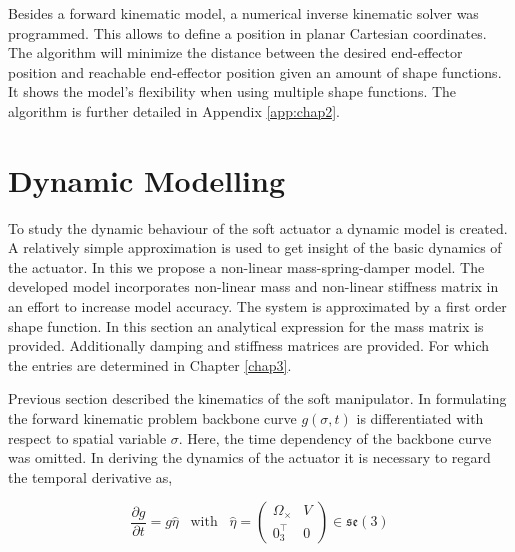 Besides a forward kinematic model, a numerical inverse kinematic solver was programmed. This allows to define a position in planar Cartesian coordinates. The algorithm will minimize the distance between the desired end-effector position and reachable end-effector position given an amount of shape functions. It shows the model's flexibility when using multiple shape functions. The algorithm is further detailed in Appendix \ref{app:chap2}. 

\newpage


\section{Dynamic Modelling}


To study the dynamic behaviour of the soft actuator a dynamic model is created. A relatively simple approximation is used to get insight of the basic dynamics of the actuator. In this we propose a non-linear mass-spring-damper model. The developed model incorporates non-linear mass and non-linear stiffness matrix in an effort to increase model accuracy. The system is approximated by a first order shape function. In this section an analytical expression for the mass matrix is provided. Additionally damping and stiffness matrices are provided. For which the entries are determined in Chapter \ref{chap3}.

Previous section described the kinematics of the soft manipulator. In formulating the forward kinematic problem backbone curve $g(\sigma,t)$ is differentiated with respect to spatial variable $\sigma$. Here, the time dependency of the backbone curve was omitted. In deriving the dynamics of the actuator it is necessary to regard the temporal derivative as,


\begin{equation}
    \frac{\partial g}{\partial t} = g \hat{\eta} \hspace{10pt} \text{with} \hspace{10pt}  \hat{\eta} = \begin{pmatrix} \Omega_\times & V \\ 0_3^\top & 0 \end{pmatrix} \in  \mathfrak{se}(3)
    \label{eq2:dgdt}
\end{equation}

